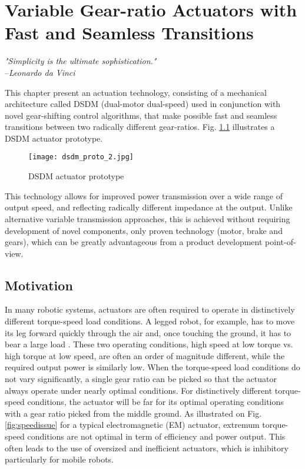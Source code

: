 \chapter{Variable Gear-ratio Actuators with Fast and Seamless Transitions }
\label{sec:MultipleSpeedActuationTechnology}

\begin{flushright}
\textit{"Simplicity is the ultimate sophistication."} \\ --\emph{Leonardo da Vinci}
\end{flushright}

This chapter present an actuation technology, consisting of a mechanical architecture called DSDM (dual-motor dual-speed) used in conjunction with novel gear-shifting control algorithms, that make possible fast and seamless transitions between two radically different gear-ratios. Fig. \ref{fig:dsdm_proto} illustrates a DSDM actuator prototype. 

\begin{figure}[H]
	\centering
		\texttt{[image: dsdm\_proto\_2.jpg]}
	\caption{DSDM actuator prototype}
	\label{fig:dsdm_proto}
\end{figure}

This technology allows for improved power transmission over a wide range of output speed, and reflecting radically different impedance at the output. Unlike alternative variable transmission approaches, this is achieved without requiring development of novel components, only proven technology (motor, brake and gears), which can be greatly advantageous from a product development point-of-view. 

\section{Motivation}
\label{sec:mot}

In many robotic systems, actuators are often required to operate in distinctively different torque-speed load conditions. A legged robot, for example, has to move its leg forward quickly through the air and, once touching the ground, it has to bear a large load \cite{hirose_study_1984}. These two operating conditions, high speed at low torque vs. high torque at low speed, are often an order of magnitude different, while the required output power is similarly low. When the torque-speed load conditions do not vary significantly, a single gear ratio can be picked so that the actuator always operate under nearly optimal conditions. For distinctively different torque-speed conditions, the actuator will be far for its optimal operating conditions with a gear ratio picked from the middle ground. As illustrated on Fig. \ref{fig:speedissue} for a typical electromagnetic (EM) actuator, extremum torque-speed conditions are not optimal in term of efficiency and power output. This often leads to the use of oversized and inefficient actuators, which is inhibitory particularly for mobile robots.

